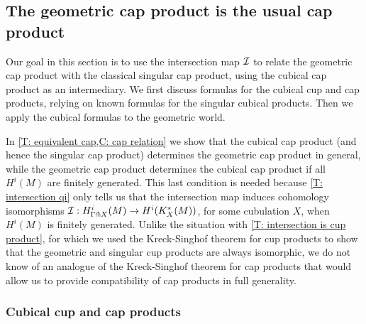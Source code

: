\begin{comment}
\begin{theorem}
Let $M$ and $N$ be manifolds. Then the geometric cohomology cross product $H^i_\Gamma(M)\otimes H^j_\Gamma(N) \to H^{i+j}_\Gamma(M \times N)$ is isomorphic to the singular cohomology cross product $H^i(M)\otimes H^j(N) \to H^{i+j}(M \times N)$.
\end{theorem}



\begin{proof}
NEED MORE GENERAL INTERSECTION MAP THEOREM OR TO RESTRICT TO COMPACT MANIFOLDS

\end{proof}
\end{comment}




\subsection{The geometric cap product is the usual cap product}

Our goal in this section is to use the intersection map $\mathcal{I}$ to relate the geometric cap product with the classical singular cap product, using the cubical cap product as an intermediary. We first discuss formulas for the cubical cup and cap products, relying on known formulas for the singular cubical products. Then we apply the cubical formulas to the geometric world.

In \cref{T: equivalent cap,C: cap relation} we show that the cubical cap product (and hence the singular cap product) determines the geometric cap product in general, while the geometric cap product determines the cubical cap product if all $H^i(M)$ are finitely generated. This last condition is needed because \cref{T: intersection qi} only tells us that the intersection map induces cohomology isomorphisms $\mathcal{I}: H^i_{\Gamma\pitchfork X}(M) \to H^i(K_X^*(M))$, for some cubulation $X$, when $H^i(M)$ is finitely generated. Unlike the situation with \cref{T: intersection is cup product}, for which we used the Kreck-Singhof theorem for cup products to show that the geometric and singular cup products are always isomorphic, we do not know of an analogue of the Kreck-Singhof theorem for cap products that would allow us to provide compatibility of cap products in full generality.




\subsubsection{Cubical cup and cap products}\label{S: cubical products}

